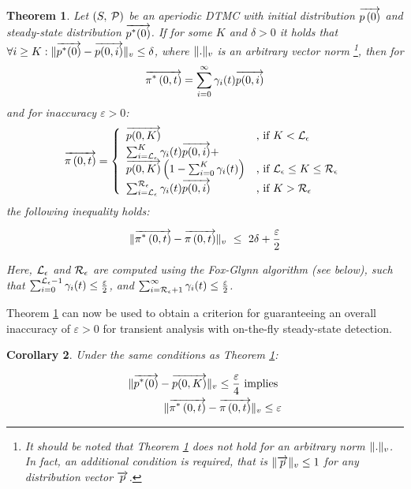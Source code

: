 \documentclass[times, 10pt,twocolumn]{article}
\newtheorem{theorem}{Theorem}
\newtheorem{corollary}[theorem]{Corollary}
\begin{document}
		\begin{theorem}
			\cite{MalhotraMT_MR94} Let $\left( S,\: \mathcal{P} \right)$ be an aperiodic DTMC with initial distribution $\overrightarrow{p \left( 0 \right)}$ and steady-state distribution $\overrightarrow{p^{*}(0)}$. If for some $K$ and $\delta > 0$ it holds that $\forall i \geq K : \lVert \overrightarrow{p^{*}(0)} - \overrightarrow{p(0,i)} \rVert_{v} \leq \delta$, where $\lVert . \rVert_{v}$ is an arbitrary vector norm \footnote{It should be noted that Theorem \ref{th:error_fwd_initial} does not hold for an arbitrary norm $\lVert . \rVert_{v}$. In fact, an additional  condition is required, that is $\lVert \overrightarrow{p} \rVert_{v}\leq 1$ for any distribution vector $\overrightarrow{p}$.}, then for
			{\small
			\[
				\overrightarrow{\pi^{*} \left(0, t \right )} = \sum_{i=0}^{\infty}\gamma_{i}(t) \overrightarrow{p(0,i)}
			\]
			}
			and for inaccuracy $\varepsilon > 0$:
			{\small
			\begin{equation}
				\displaystyle
				\overrightarrow{\pi \left(0, t \right )} = \left\{
				\begin{array}{ll}
					\overrightarrow{p(0,K)} & \text{, if } K < \mathcal{L}_{\epsilon}\\
					\sum_{i=\mathcal{L}_{\epsilon}}^{K}\gamma_{i}(t) \overrightarrow{p(0,i)} + & \\
					\overrightarrow{p(0,K)} \left(1- \sum_{i=0}^{K}\gamma_{i}(t) \right) & \text{, if } \mathcal{L}_{\epsilon} \leq K \leq \mathcal{R}_{\epsilon}\\
					\sum_{i=\mathcal{L}_{\epsilon}}^{\mathcal{R}_{\epsilon}}\gamma_{i}(t) \overrightarrow{p(0,i)} & \text{, if } K > \mathcal{R}_{\epsilon}\\
				\end{array}
				\right .
				\label{eq:ssd_LR_initial}
			\end{equation}
			}
			the following inequality holds:
			{\small
			\begin{fframe}{0.6}{-0.3}
				\[
					\lVert \overrightarrow{\pi^{*} \left(0, t \right )} - \overrightarrow{\pi \left(0, t \right )} \rVert_{v} \ \leq \ 2 \delta + \frac{\varepsilon}{2}
				\]
			\end{fframe}
			}
			Here, $\mathcal{L}_{\epsilon}$ and $\mathcal{R}_{\epsilon}$ are computed using the Fox-Glynn algorithm (see below), such that $\sum_{i=0}^{\mathcal{L}_{\epsilon}-1} \gamma_{i}(t) \leq \frac{\varepsilon}{2}$, and $\sum_{i=\mathcal{R}_{\epsilon}+1}^{\infty} \gamma_{i}(t) \leq \frac{\varepsilon}{2}$.
			\label{th:error_fwd_initial}
		\end{theorem}
		
		Theorem \ref{th:error_fwd_initial} can now be used to obtain a criterion for guaranteeing an overall inaccuracy of $\varepsilon > 0$ for transient analysis with on-the-fly steady-state detection.
		
		\begin{corollary}
			Under the same conditions as Theorem \ref{th:error_fwd_initial}: 
			{\small
				\begin{fframe}{0.68}{-0.3}
					\begin{eqnarray}
						\lVert \overrightarrow{p^{*}(0)} - \overrightarrow{p(0,K)} \rVert_{v} \leq \frac{\varepsilon}{4} \nonumber \text{ implies } \\
						\lVert \overrightarrow{\pi^{*} \left(0, t \right )} - \overrightarrow{\pi \left(0, t \right )} \rVert_{v} \leq \varepsilon
						\label{eq:malh_cr_cor}
					\end{eqnarray}
				\end{fframe}
			}
			\label{cl:error_fwd_initial}
 		\end{corollary}
\end{document}
